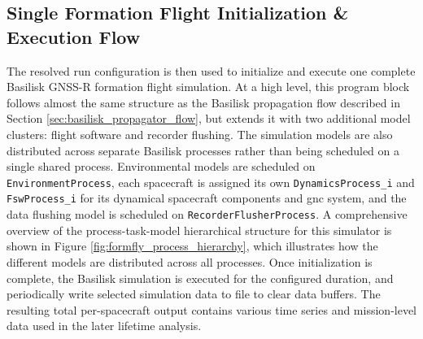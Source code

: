 \subsection{Single Formation Flight Initialization \& Execution Flow}
The resolved run configuration is then used to initialize and execute one complete Basilisk GNSS-R formation flight simulation. At a high level, this program block follows almost the same structure as the Basilisk propagation flow described in Section \ref{sec:basilisk_propagator_flow}, but extends it with two additional model clusters: flight software and recorder flushing. The simulation models are also distributed across separate Basilisk processes rather than being scheduled on a single shared process. Environmental models are scheduled on \texttt{EnvironmentProcess}, each spacecraft is assigned its own \texttt{DynamicsProcess\_i} and \texttt{FswProcess\_i} for its dynamical spacecraft components and \gls{gnc} system, and the data flushing model is scheduled on \texttt{RecorderFlusherProcess}. A comprehensive overview of the process-task-model hierarchical structure for this simulator is shown in Figure \ref{fig:formfly_process_hierarchy}, which illustrates how the different models are distributed across all processes. Once initialization is complete, the Basilisk simulation is executed for the configured duration, and periodically write selected simulation data to file to clear data buffers. The resulting total per-spacecraft output contains various time series and mission-level data used in the later lifetime analysis.



